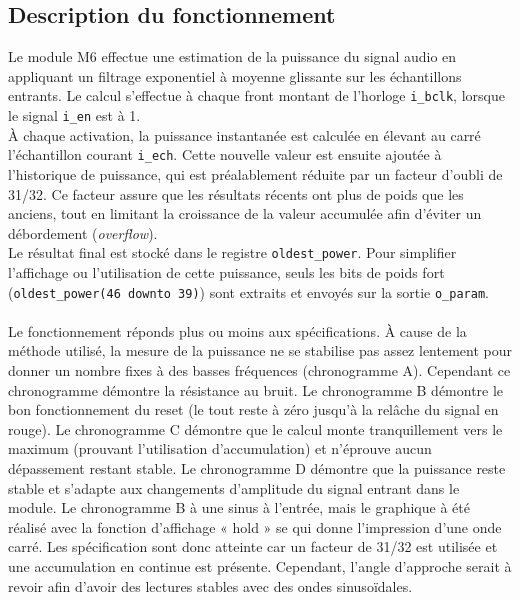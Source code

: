 

\subsection{Description du fonctionnement}

Le module M6 effectue une estimation de la puissance du signal audio en
appliquant un filtrage exponentiel à moyenne glissante sur les échantillons
entrants. Le calcul s'effectue à chaque front montant de l'horloge
\verb|i_bclk|, lorsque le signal \verb|i_en| est à 1. \\

À chaque activation, la puissance instantanée est calculée en élevant au
carré l'échantillon courant \verb|i_ech|. Cette nouvelle valeur est ensuite
ajoutée à l'historique de puissance, qui est préalablement réduite par un
facteur d'oubli de 31/32. Ce facteur assure que les résultats récents ont
plus de poids que les anciens, tout en limitant la croissance de la valeur
accumulée afin d'éviter un débordement (\emph{overflow}). \\

Le résultat final est stocké dans le registre \verb|oldest_power|. Pour
simplifier l'affichage ou l'utilisation de cette puissance, seuls les bits de
poids fort (\verb|oldest_power(46 downto 39)|) sont extraits et envoyés sur
la sortie \verb|o_param|. \\

\\

Le fonctionnement réponds plus ou moins aux spécifications. À cause de la méthode utilisé, la mesure de la puissance ne se stabilise pas assez lentement pour donner un nombre fixes à des basses fréquences (chronogramme A). Cependant ce chronogramme démontre la résistance au bruit. Le chronogramme B démontre le bon fonctionnement du reset (le tout reste à zéro jusqu’à la relâche du signal en rouge). Le chronogramme C démontre que le calcul monte tranquillement vers le maximum (prouvant l'utilisation d'accumulation) et n'éprouve aucun dépassement restant stable. Le chronogramme D démontre que la puissance reste stable et s'adapte aux changements d'amplitude du signal entrant dans le module. Le chronogramme B à une sinus à l'entrée, mais le graphique à été réalisé avec la fonction d'affichage « hold » se qui donne l'impression d'une onde carré. Les spécification sont donc atteinte car un facteur de 31/32 est utilisée et une accumulation en continue est présente. Cependant, l'angle d'approche serait à revoir afin d'avoir des lectures stables avec des ondes sinusoïdales.


